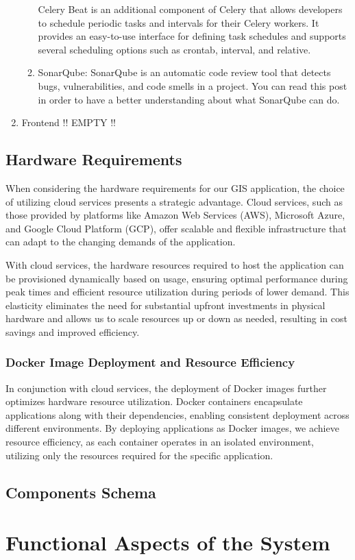 \begin{enumerate}
\begin{enumerate}
        Celery Beat is an additional component of Celery that allows developers to schedule periodic tasks and intervals for their Celery workers. It provides an easy-to-use interface for defining task schedules and supports several scheduling options such as crontab, interval, and relative.
    
        \item SonarQube: SonarQube is an automatic code review tool that detects bugs, vulnerabilities, and code smells in a project. You can read this post in order to have a better understanding about what SonarQube can do.
    \end{enumerate}

    \item Frontend !! EMPTY !!
    

\end{enumerate}
\subsection{Hardware Requirements}
When considering the hardware requirements for our GIS application, the choice of utilizing cloud services presents a strategic advantage. Cloud services, such as those provided by platforms like Amazon Web Services (AWS), Microsoft Azure, and Google Cloud Platform (GCP), offer scalable and flexible infrastructure that can adapt to the changing demands of the application.

With cloud services, the hardware resources required to host the application can be provisioned dynamically based on usage, ensuring optimal performance during peak times and efficient resource utilization during periods of lower demand. This elasticity eliminates the need for substantial upfront investments in physical hardware and allows us to scale resources up or down as needed, resulting in cost savings and improved efficiency.

\subsubsection{Docker Image Deployment and Resource Efficiency}

In conjunction with cloud services, the deployment of Docker images further optimizes hardware resource utilization. Docker containers encapsulate applications along with their dependencies, enabling consistent deployment across different environments. By deploying applications as Docker images, we achieve resource efficiency, as each container operates in an isolated environment, utilizing only the resources required for the specific application. 

\subsection{Components Schema}

\section{Functional Aspects of the System}